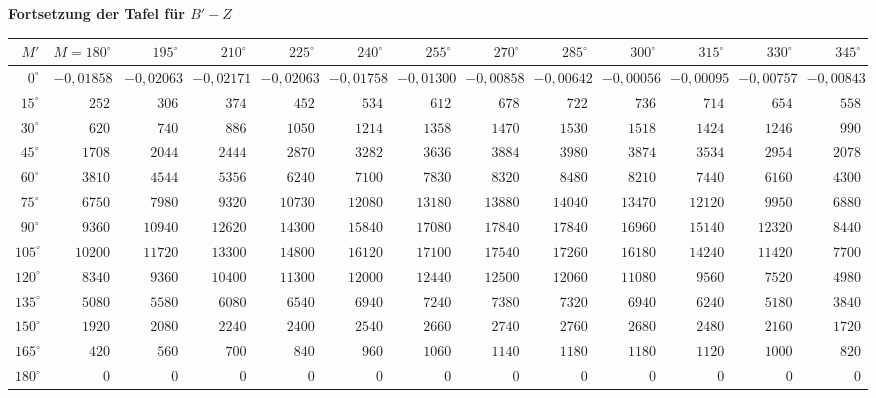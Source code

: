 \documentclass[10pt,a4paper]{article}
\begin{document}
\begin{center}
\textbf{Fortsetzung der Tafel für $B' - Z$}

\begin{longtable}{r|r|r|r|r|r|r|r|r|r|r|r|r}
\hline
$M'$ & $M=180^{\circ}$ & $195^{\circ}$ & $210^{\circ}$ & $225^{\circ}$ & $240^{\circ}$ & $255^{\circ}$ & $270^{\circ}$ & $285^{\circ}$ & $300^{\circ}$ & $315^{\circ}$ & $330^{\circ}$ & $345^{\circ}$ \\
\hline
\endhead
$0^{\circ}$ & $-0,01858$ & $-0,02063$ & $-0,02171$ & $-0,02063$ & $-0,01758$ & $-0,01300$ & $-0,00858$ & $-0,00642$ & $-0,00056$ & $-0,00095$ & $-0,00757$ & $-0,00843$ \\
$15^{\circ}$ & $252$ & $306$ & $374$ & $452$ & $534$ & $612$ & $678$ & $722$ & $736$ & $714$ & $654$ & $558$ \\
$30^{\circ}$ & $620$ & $740$ & $886$ & $1050$ & $1214$ & $1358$ & $1470$ & $1530$ & $1518$ & $1424$ & $1246$ & $990$ \\
$45^{\circ}$ & $1708$ & $2044$ & $2444$ & $2870$ & $3282$ & $3636$ & $3884$ & $3980$ & $3874$ & $3534$ & $2954$ & $2078$ \\
$60^{\circ}$ & $3810$ & $4544$ & $5356$ & $6240$ & $7100$ & $7830$ & $8320$ & $8480$ & $8210$ & $7440$ & $6160$ & $4300$ \\
$75^{\circ}$ & $6750$ & $7980$ & $9320$ & $10730$ & $12080$ & $13180$ & $13880$ & $14040$ & $13470$ & $12120$ & $9950$ & $6880$ \\
$90^{\circ}$ & $9360$ & $10940$ & $12620$ & $14300$ & $15840$ & $17080$ & $17840$ & $17840$ & $16960$ & $15140$ & $12320$ & $8440$ \\
$105^{\circ}$ & $10200$ & $11720$ & $13300$ & $14800$ & $16120$ & $17100$ & $17540$ & $17260$ & $16180$ & $14240$ & $11420$ & $7700$ \\
$120^{\circ}$ & $8340$ & $9360$ & $10400$ & $11300$ & $12000$ & $12440$ & $12500$ & $12060$ & $11080$ & $9560$ & $7520$ & $4980$ \\
$135^{\circ}$ & $5080$ & $5580$ & $6080$ & $6540$ & $6940$ & $7240$ & $7380$ & $7320$ & $6940$ & $6240$ & $5180$ & $3840$ \\
$150^{\circ}$ & $1920$ & $2080$ & $2240$ & $2400$ & $2540$ & $2660$ & $2740$ & $2760$ & $2680$ & $2480$ & $2160$ & $1720$ \\
$165^{\circ}$ & $420$ & $560$ & $700$ & $840$ & $960$ & $1060$ & $1140$ & $1180$ & $1180$ & $1120$ & $1000$ & $820$ \\
$180^{\circ}$ & $0$ & $0$ & $0$ & $0$ & $0$ & $0$ & $0$ & $0$ & $0$ & $0$ & $0$ & $0$ \\
\hline
\end{longtable}
\end{center}
\end{document}
